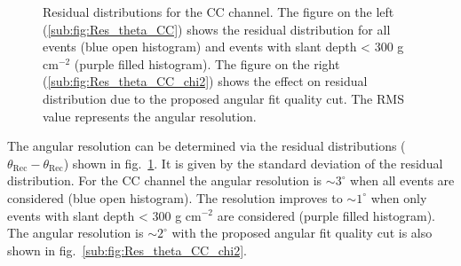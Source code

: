 \begin{figure}[h!]
  \centering
  \hfill
  \caption{Residual distributions for the CC channel. The figure on the left (\ref{sub:fig:Res_theta_CC}) shows the residual distribution for all events (blue open histogram) and events with slant depth < 300 g cm$^{-2}$ (purple filled histogram). The figure on the right (\ref{sub:fig:Res_theta_CC_chi2}) shows the effect on residual distribution due to the proposed angular fit quality cut. The RMS value represents the angular resolution.}
  \label{fig:Res_Theta}
\end{figure}

The angular resolution can be determined via the residual distributions ($\theta_{\text{Rec}} - \theta_{\text{Rec}}$) shown in fig.~\ref{fig:Res_Theta}. It is given by the standard deviation of the residual distribution. For the CC channel the angular resolution is $\sim 3^{\circ}$ when all events are considered (blue open histogram). The resolution improves to $\sim 1^{\circ}$ when only events with slant depth < 300 g cm$^{-2}$ are considered (purple filled histogram). The angular resolution is $\sim 2^{\circ}$ with the proposed angular fit quality cut is also shown in fig.~\ref{sub:fig:Res_theta_CC_chi2}. 


